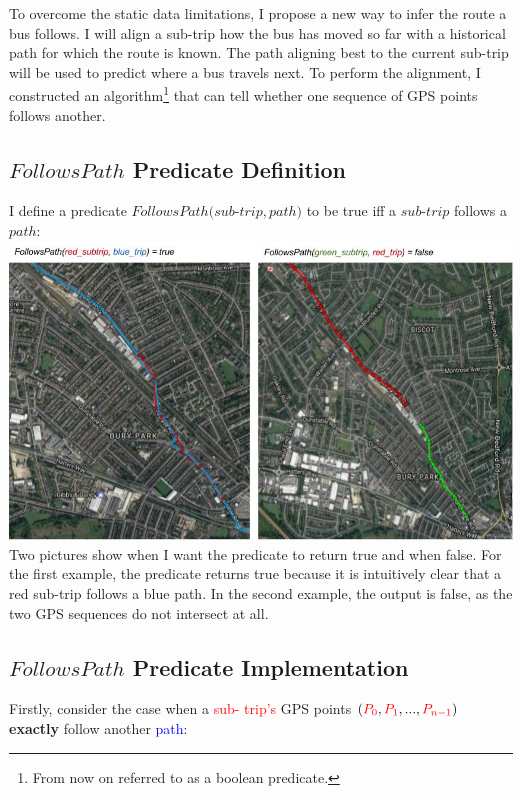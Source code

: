 \documentclass[12pt,a4paper,oneside,openright]{report}
\begin{document}
To overcome the static data limitations, I propose a new way to infer the
route a bus follows. I will align a sub-trip how the bus has moved
so far with a historical path for which the route is known. The path aligning
best to the current sub-trip will be used to predict where a bus travels next.
To perform the alignment, I constructed an algorithm\footnote{From now on referred
to as a boolean predicate.} that can tell whether one sequence of GPS points 
follows another.

\subsection{$FollowsPath$ Predicate Definition}

I define a predicate $FollowsPath(sub$-$trip, path)$ to be true iff a $sub$-$trip$
follows a $path$: \\

\includegraphics[width=\textwidth, scale=1.2]{figs/follows_path.jpg} \\

Two pictures show when I want the predicate to return true and when false.
For the first example, the predicate returns true because it is intuitively
clear that a red sub-trip follows a blue path. In the second example, the
output is false, as the two GPS sequences do not intersect at all.

\newpage

\subsection{$FollowsPath$ Predicate Implementation}

Firstly, consider the case when a \textcolor{red}{sub- trip's} GPS points
$(\textcolor{red}{P_0}, \textcolor{red}{P_1}, ..., \textcolor{red}{P_{n-1}})$
\textbf{exactly} follow another \textcolor{blue}{path}: \\
\end{document}

